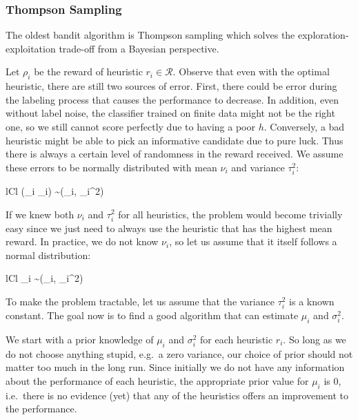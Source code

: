 \documentclass[fleqn,10pt,lineno]{wlpeerj} %
\newcommand{\Normal}{\mathcal{N}}
\newcommand{\R}{\mathcal{R}}
\begin{document}
\subsubsection{Thompson Sampling}

The oldest bandit algorithm is Thompson sampling \citep{thompson33} which
solves the exploration-exploitation trade-off from a Bayesian perspective.

Let $\rho_i$ be the reward of heuristic $r_i \in \R$. Observe
that even with the optimal heuristic, there are still two sources of error.
First, there could be error during the labeling process that causes the
performance to decrease. In addition, even without label noise, the classifier
trained on finite data might not be the right one, so we still cannot score
perfectly due to having a poor $h$. Conversely, a bad heuristic might be able
to pick an informative candidate due to pure luck. Thus there is always a
certain level of randomness in the reward received. We assume these errors to
be normally distributed with mean $\nu_i$ and variance $\tau_i^2$:
	\begin{IEEEeqnarray*}{lCl}
		(\rho_i \mid \nu_i) \sim \Normal(\nu_i, \tau_i^2)
	\end{IEEEeqnarray*}

If we knew both $\nu_i$ and $\tau_i^2$ for all heuristics, the problem would
become trivially easy since we just need to always use the heuristic that has
the highest mean reward. In practice, we do not know $\nu_i$, so let us assume
that it itself follows a normal distribution:
	\begin{IEEEeqnarray*}{lCl}
        \nu_i \sim \Normal(\mu_i, \sigma_i^2)
    \end{IEEEeqnarray*}

To make the problem tractable, let us assume that the variance $\tau_i^2$ is a
known constant. The goal now is to find a good algorithm that can estimate
$\mu_i$ and $\sigma_i^2$.

We start with a prior knowledge of $\mu_i$ and $\sigma_i^2$ for each heuristic
$r_i$. So long as we do not choose anything stupid, e.g.\ a zero variance, our
choice of prior should not matter too much in the long run. Since initially we
do not have any information about the performance of each heuristic, the
appropriate prior value for $\mu_i$ is $0$, i.e.\ there is no evidence (yet)
that any of the heuristics offers an improvement to the performance.
\end{document}
